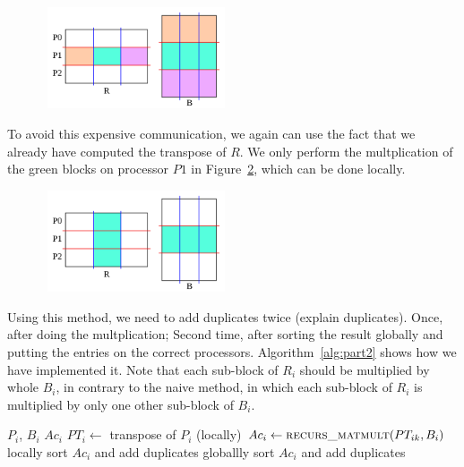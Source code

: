 \begin{figure}[tbh]
 \centering
 \includegraphics[width=5.5cm,height=3cm]{./figures/part2d.pdf}
 \caption{}
 \label{fig:part2d}
\end{figure}

To avoid this expensive communication, we again can use the fact that we already have computed the transpose of $R$. We only perform the multplication of the green blocks on processor $P1$ in Figure~\ref{fig:part2e}, which can be done locally.

\begin{figure}[tbh]
 \centering
 \includegraphics[width=5.5cm,height=3cm]{./figures/part2e.pdf}
 \caption{}
 \label{fig:part2e}
\end{figure}

Using this method, we need to add duplicates twice (explain duplicates). Once, after doing the multplication; Second time, after sorting the result globally and putting the entries on the correct processors. Algorithm~\ref{alg:part2} shows how we have implemented it. Note that each sub-block of $R_i$ should be multiplied by whole $B_i$, in contrary to the naive method, in which each sub-block of $R_i$ is multiplied by only one other sub-block of $B_i$.

\begin{algorithm}[H] 
  \caption{Part 2: $Ac = R \times B$} \label{alg:part2} 
  \begin{algorithmic}[1]
    \Require $P_i$, $B_i$
    \Ensure  $Ac_i$
    \State $PT_i \leftarrow$ transpose of $P_i$ (locally)
      \State $Ac_i \leftarrow \textsc{recurs\_matmult}(PT_{ik}, B_i)$
    \EndFor
    \State locally sort $Ac_i$ and add duplicates
    \State globallly sort $Ac_i$ and add duplicates
  \end{algorithmic}
\end{algorithm}

